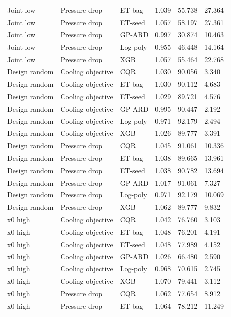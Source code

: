 \begin{longtable}{llllll}
Joint low & Pressure drop & ET-bag & 1.039 & 55.738 & 27.364\\
Joint low & Pressure drop & ET-seed & 1.057 & 58.197 & 27.361\\
Joint low & Pressure drop & GP-ARD & 0.997 & 30.874 & 10.463\\
Joint low & Pressure drop & Log-poly & 0.955 & 46.448 & 14.164\\
Joint low & Pressure drop & XGB & 1.057 & 55.464 & 22.768\\
Design random & Cooling objective & CQR & 1.030 & 90.056 & 3.340\\
Design random & Cooling objective & ET-bag & 1.030 & 90.112 & 4.683\\
Design random & Cooling objective & ET-seed & 1.029 & 89.721 & 4.576\\
Design random & Cooling objective & GP-ARD & 0.995 & 90.447 & 2.192\\
Design random & Cooling objective & Log-poly & 0.971 & 92.179 & 2.494\\
Design random & Cooling objective & XGB & 1.026 & 89.777 & 3.391\\
Design random & Pressure drop & CQR & 1.045 & 91.061 & 10.336\\
Design random & Pressure drop & ET-bag & 1.038 & 89.665 & 13.961\\
Design random & Pressure drop & ET-seed & 1.038 & 90.782 & 13.694\\
Design random & Pressure drop & GP-ARD & 1.017 & 91.061 & 7.327\\
Design random & Pressure drop & Log-poly & 0.971 & 92.179 & 10.069\\
Design random & Pressure drop & XGB & 1.062 & 89.777 & 9.832\\
x0 high & Cooling objective & CQR & 1.042 & 76.760 & 3.103\\
x0 high & Cooling objective & ET-bag & 1.048 & 76.201 & 4.191\\
x0 high & Cooling objective & ET-seed & 1.048 & 77.989 & 4.152\\
x0 high & Cooling objective & GP-ARD & 1.026 & 66.480 & 2.590\\
x0 high & Cooling objective & Log-poly & 0.968 & 70.615 & 2.745\\
x0 high & Cooling objective & XGB & 1.070 & 79.441 & 3.112\\
x0 high & Pressure drop & CQR & 1.062 & 77.654 & 8.912\\
x0 high & Pressure drop & ET-bag & 1.064 & 78.212 & 11.249\\

\end{longtable}
